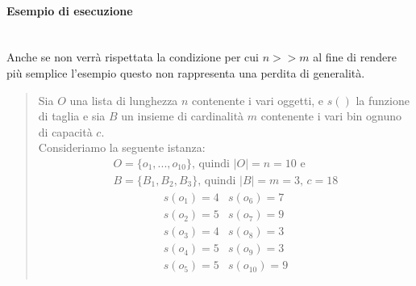 \paragraph{Esempio di esecuzione}\mbox{}\\
Anche se non verrà rispettata la condizione per cui $ n >> m $ al fine di rendere più semplice l'esempio questo non rappresenta una perdita di generalità.
\begin{quote}
	Sia $ O $ una lista di lunghezza $ n $ contenente i vari oggetti, e $ s() $
	la funzione di taglia e sia $ B $ un insieme di cardinalità $ m $ contenente i vari bin ognuno di capacità $ c $. \\
	Consideriamo la seguente istanza:
	\begin{equation*}
		\begin{array}{c}
			O = \{o_1, ..., o_{10}\} \text{, quindi } |O| = n = 10 \text{ e} \\
			B = \{B_1, B_2, B_3\} \text{, quindi } |B| = m = 3 \text{, } c = 18
	    \end{array}
	\end{equation*}
	\begin{equation*}
	    \begin{array}{cc}
			s(o_1) = 4	&	s(o_6) = 7   \\
			s(o_2) = 5	&	s(o_7) = 9  \\
			s(o_3) = 4	&	s(o_8) = 3   \\
			s(o_4) = 5	&	s(o_9) = 3   \\
			s(o_5) = 5	&	s(o_{10}) = 9 \\
		\end{array}
	\end{equation*}
	

\end{quote}
